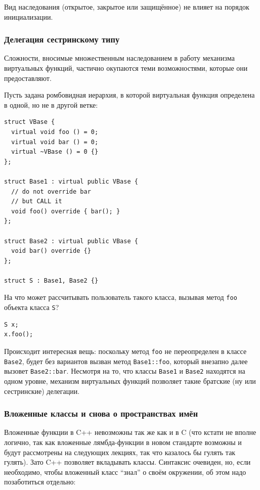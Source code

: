 \documentclass[a4paper,12pt,oneside]{article}
\begin{document}
Вид наследования (открытое, закрытое или защищённое) не влияет на порядок инициализации.

\subsubsection{Делегация сестринскому типу}

Сложности, вносимые множественным наследованием в работу механизма виртуальных функций, частично окупаются теми возможностями, которые они предоставляют.

Пусть задана ромбовидная иерархия, в которой виртуальная функция определена в одной, но не в другой ветке:

\begin{lstlisting}
struct VBase {
  virtual void foo () = 0;
  virtual void bar () = 0;
  virtual ~VBase () = 0 {}
};

struct Base1 : virtual public VBase {
  // do not override bar
  // but CALL it
  void foo() override { bar(); }  
};

struct Base2 : virtual public VBase {
  void bar() override {}
};

struct S : Base1, Base2 {}
\end{lstlisting}

На что может рассчитывать пользователь такого класса, вызывая метод \lstinline!foo! объекта класса \lstinline!S!?

\begin{lstlisting}
S x;
x.foo();
\end{lstlisting}

Происходит интересная вещь: поскольку метод \lstinline!foo! не переопределен в классе \lstinline!Base2!, будет без вариантов вызван метод \lstinline!Base1::foo!, который внезапно далее вызовет \lstinline!Base2::bar!. Несмотря на то, что классы \lstinline!Base1! и \lstinline!Base2! находятся на одном уровне, механизм виртуальных функций позволяет такие братские (ну или сестринские) делегации.

\subsubsection{Вложенные классы и снова о пространствах имён}\label{InnerClasses}

Вложенные функции в C++ невозможны так же как и в C (что кстати не вполне логично, так как вложенные лямбда-функции в новом стандарте возможны и будут рассмотрены на следующих лекциях, так что казалось бы гулять так гулять). Зато C++ позволяет вкладывать классы. Синтаксис очевиден, но, если необходимо, чтобы вложенный класс ``знал'' о своём окружении, об этом надо позаботиться отдельно:
\end{document}
